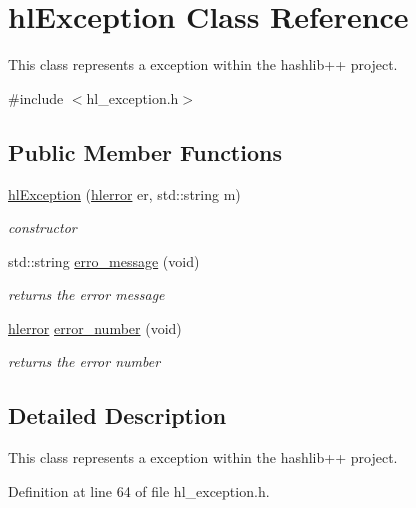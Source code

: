\hypertarget{classhl_exception}{
\section{hlException Class Reference}
\label{classhl_exception}
}


This class represents a exception within the hashlib++ project.  


{\ttfamily \#include $<$hl\_\-exception.h$>$}\subsection*{Public Member Functions}
\begin{DoxyCompactItemize}
\item 
\hyperlink{classhl_exception_a7865e073d450fb1f139db18328d4b380}{hlException} (\hyperlink{hl__exception_8h_a3590cc719fa5c1d8e999716d9e7303b5}{hlerror} er, std::string m)
\begin{DoxyCompactList}\small\item\em constructor \item\end{DoxyCompactList}\item 
std::string \hyperlink{classhl_exception_ae3217dae99447bc3b4062ae6bc0d3326}{erro\_\-message} (void)
\begin{DoxyCompactList}\small\item\em returns the error message \item\end{DoxyCompactList}\item 
\hyperlink{hl__exception_8h_a3590cc719fa5c1d8e999716d9e7303b5}{hlerror} \hyperlink{classhl_exception_a4bf028d62d1e53992701039bf55f6d15}{error\_\-number} (void)
\begin{DoxyCompactList}\small\item\em returns the error number \item\end{DoxyCompactList}\end{DoxyCompactItemize}


\subsection{Detailed Description}
This class represents a exception within the hashlib++ project. 

Definition at line 64 of file hl\_\-exception.h.

